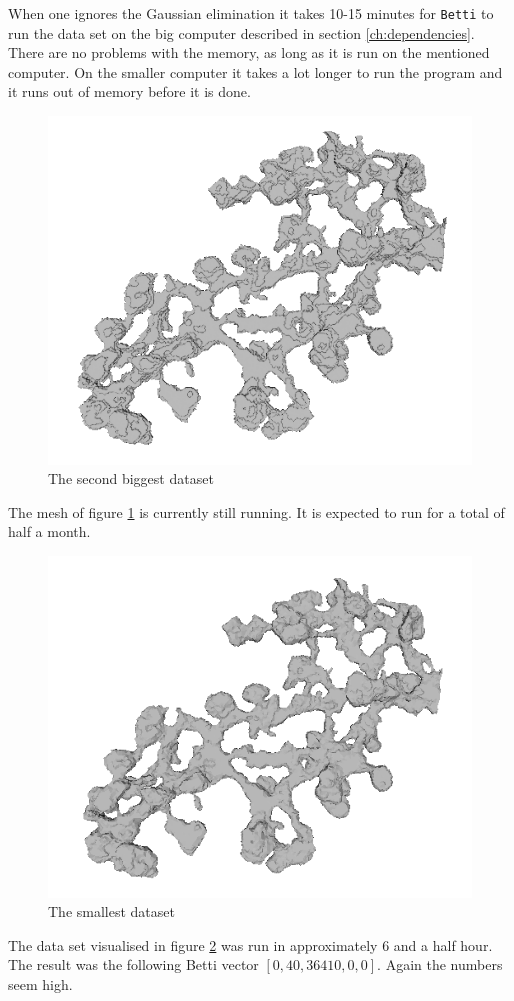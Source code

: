 \documentclass[11pt,a4paper,twoside]{report}
\begin{document}
When one ignores the Gaussian elimination it takes 10-15 minutes for \texttt{Betti} to run the data set on the big computer described in section \ref{ch:dependencies}. There are no problems with the memory, as long as it is run on the mentioned computer. On the smaller computer it takes a lot longer to run the program and it runs out of memory before it is done.
\begin{figure}[H]
\center
\includegraphics[scale=0.5]{testmesh2d00.png}
\caption{The second biggest dataset}
\label{fig:mesh_2d}
\end{figure}
The mesh of figure \ref{fig:mesh_2d} is currently still running. It is expected to run for a total of half a month.

\begin{figure}[H]
\center
\includegraphics[scale=0.5]{testmesh00.png}
\caption{The smallest dataset}
\label{fig:mesh_}
\end{figure}
The data set visualised in figure \ref{fig:mesh_} was run in approximately 6 and a half hour. The result was the following Betti vector $[0,40,36410,0,0]$. Again the numbers seem high.
\end{document}
